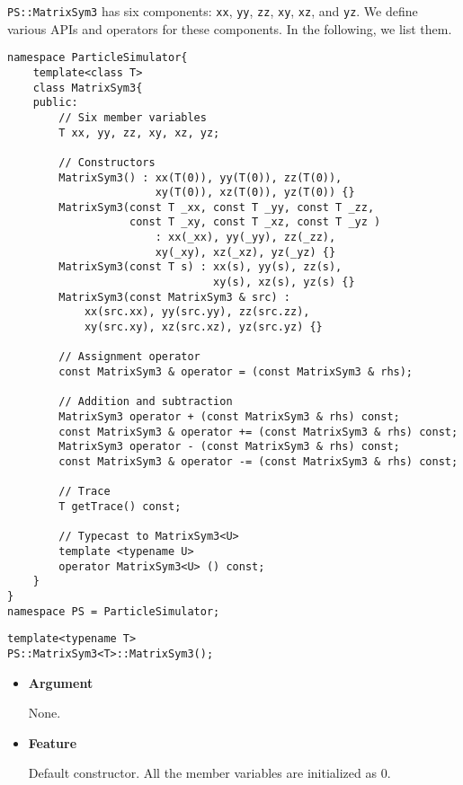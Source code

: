 \texttt{PS::MatrixSym3} has six components: \texttt{xx}, \texttt{yy}, \texttt{zz}, \texttt{xy}, \texttt{xz}, and \texttt{yz}.
We define various APIs and operators for these components.
In the following, we list them.
\begin{lstlisting}[caption=MatrixSym3]
namespace ParticleSimulator{
    template<class T>
    class MatrixSym3{
    public:
        // Six member variables
        T xx, yy, zz, xy, xz, yz;

        // Constructors
        MatrixSym3() : xx(T(0)), yy(T(0)), zz(T(0)),
                       xy(T(0)), xz(T(0)), yz(T(0)) {}
        MatrixSym3(const T _xx, const T _yy, const T _zz,
                   const T _xy, const T _xz, const T _yz )
                       : xx(_xx), yy(_yy), zz(_zz),
                       xy(_xy), xz(_xz), yz(_yz) {}
        MatrixSym3(const T s) : xx(s), yy(s), zz(s),
                                xy(s), xz(s), yz(s) {}
        MatrixSym3(const MatrixSym3 & src) :
            xx(src.xx), yy(src.yy), zz(src.zz),
            xy(src.xy), xz(src.xz), yz(src.yz) {}

        // Assignment operator
        const MatrixSym3 & operator = (const MatrixSym3 & rhs);

        // Addition and subtraction
        MatrixSym3 operator + (const MatrixSym3 & rhs) const;
        const MatrixSym3 & operator += (const MatrixSym3 & rhs) const;
        MatrixSym3 operator - (const MatrixSym3 & rhs) const;
        const MatrixSym3 & operator -= (const MatrixSym3 & rhs) const;

        // Trace
        T getTrace() const;

        // Typecast to MatrixSym3<U>
        template <typename U>
        operator MatrixSym3<U> () const;
    }
}
namespace PS = ParticleSimulator;
\end{lstlisting}


\begin{screen}
\begin{verbatim}
template<typename T>
PS::MatrixSym3<T>::MatrixSym3();
\end{verbatim}
\end{screen}

\begin{itemize}

\item{{\bf Argument}}

  None.

\item{{\bf Feature}}

Default constructor. All the member variables are initialized as 0.

\end{itemize}

